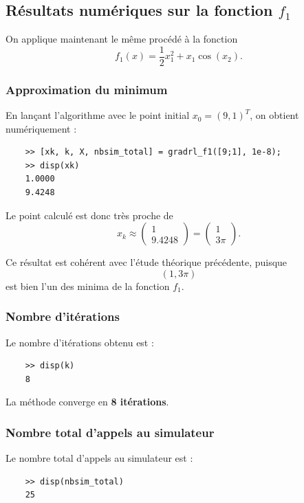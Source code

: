 \documentclass[a4paper,12pt]{article}
\begin{document}
	\subsection{Résultats numériques sur la fonction $f_1$}
	
	On applique maintenant le même procédé à la fonction
	\[
	f_1(x)=\frac12 x_1^2 + x_1\cos(x_2).
	\]
	
	\subsubsection{Approximation du minimum}
	
	En lançant l'algorithme avec le point initial $x_0=(9,1)^T$, on obtient numériquement :
	\begin{verbatim}
	>> [xk, k, X, nbsim_total] = gradrl_f1([9;1], 1e-8);
	>> disp(xk)
	1.0000
	9.4248
	\end{verbatim}
	
	Le point calculé est donc très proche de
	\[
	x_k \approx
	\begin{pmatrix}
	1\\
	9.4248
	\end{pmatrix}
	=
	\begin{pmatrix}
	1\\
	3\pi
	\end{pmatrix}.
	\]
	
	Ce résultat est cohérent avec l'étude théorique précédente, puisque
	\[
	(1,3\pi)
	\]
	est bien l'un des minima de la fonction $f_1$.
	
	\subsubsection{Nombre d'itérations}
	
	Le nombre d'itérations obtenu est :
	\begin{verbatim}
	>> disp(k)
	8
	\end{verbatim}
	
	La méthode converge en \textbf{8 itérations}.
	
	\subsubsection{Nombre total d'appels au simulateur}
	
	Le nombre total d'appels au simulateur est :
	\begin{verbatim}
	>> disp(nbsim_total)
	25
	\end{verbatim}
	
\end{document}
